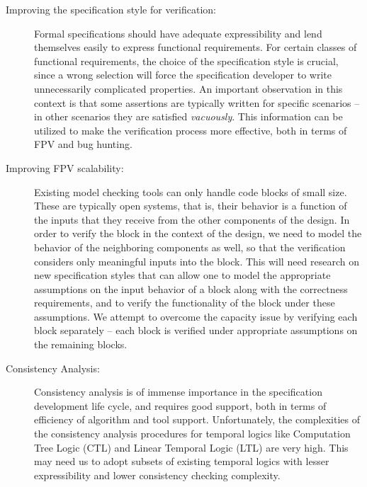 \begin{description}


\item [Improving the specification style for verification:] 
	Formal specifications should have 
	adequate expressibility and lend themselves easily to express 
	functional requirements. For certain classes of functional 
	requirements, the choice of the specification style is crucial, 
	since a wrong selection will force the specification developer to 
	write unnecessarily complicated properties. An important observation 
	in this context is that some assertions are typically written for 
	specific scenarios -- in other scenarios they are satisfied {\em vacuously}.
	This information can be utilized to make the verification process 
	more effective, both in terms of FPV and bug hunting. 

\item [Improving FPV scalability:] Existing model checking tools can
	only handle code blocks of small size. These are typically open
	systems, that is, their behavior is a function of the inputs that
	they receive from the other components of the design. In order to
	verify the block in the context of the design, we need to model the
	behavior of the neighboring components as well, so that the
	verification considers only meaningful inputs into the block. 
	This will need research on new specification styles that can allow 
	one to model the appropriate assumptions on the input behavior of a
	block along with the correctness requirements, and to verify the 
	functionality of the block under these
	assumptions. We attempt to overcome the capacity issue by 
	verifying each block separately -- each block is verified under
	appropriate assumptions on the remaining blocks.

\item [Consistency Analysis:] Consistency analysis is of immense 
	importance in the specification development life cycle, and requires 
	good support, both in terms of efficiency of algorithm and tool support. 
	Unfortunately, the complexities of the consistency analysis procedures 
	for temporal logics like Computation Tree Logic (CTL) and Linear Temporal 
	Logic (LTL) are very high. This may need us 
	to adopt subsets of existing temporal logics with lesser expressibility 
	and lower consistency checking complexity. 
	

\end{description}
